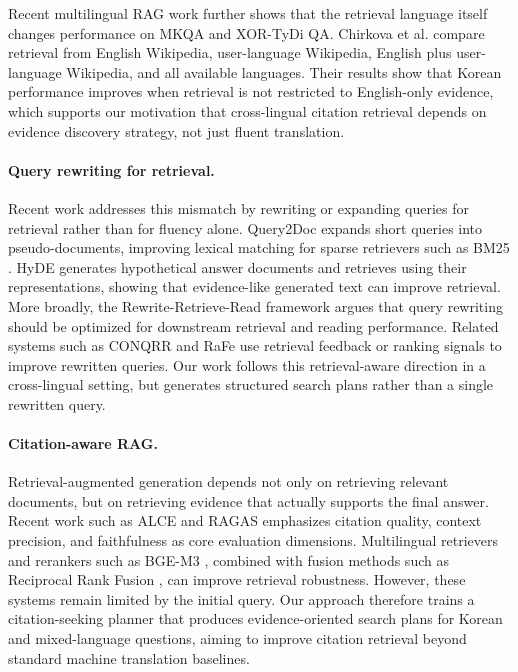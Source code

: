 \documentclass{article}
\begin{document}
Recent multilingual RAG work further shows that the retrieval language itself changes performance on MKQA and XOR-TyDi QA. Chirkova et al. \cite{chirkova2024mrag} compare retrieval from English Wikipedia, user-language Wikipedia, English plus user-language Wikipedia, and all available languages. Their results show that Korean performance improves when retrieval is not restricted to English-only evidence, which supports our motivation that cross-lingual citation retrieval depends on evidence discovery strategy, not just fluent translation.



\paragraph{Query rewriting for retrieval.}
Recent work addresses this mismatch by rewriting or expanding queries for retrieval rather than for fluency alone. Query2Doc \cite{wang2023query2doc} expands short queries into pseudo-documents, improving lexical matching for sparse retrievers such as BM25 \cite{robertson2009bm25}. HyDE \cite{gao2022precise} generates hypothetical answer documents and retrieves using their representations, showing that evidence-like generated text can improve retrieval. More broadly, the Rewrite-Retrieve-Read framework \cite{ma2023rewrite} argues that query rewriting should be optimized for downstream retrieval and reading performance. Related systems such as CONQRR \cite{anantha2021conqrr} and RaFe \cite{wang2024rafe} use retrieval feedback or ranking signals to improve rewritten queries. Our work follows this retrieval-aware direction in a cross-lingual setting, but generates structured search plans rather than a single rewritten query.

\paragraph{Citation-aware RAG.}
Retrieval-augmented generation depends not only on retrieving relevant documents, but on retrieving evidence that actually supports the final answer. Recent work such as ALCE \cite{gao2023enabling} and RAGAS \cite{es2023ragas} emphasizes citation quality, context precision, and faithfulness as core evaluation dimensions. Multilingual retrievers and rerankers such as BGE-M3 \cite{chen2024bgem3}, combined with fusion methods such as Reciprocal Rank Fusion \cite{cormack2009reciprocal}, can improve retrieval robustness. However, these systems remain limited by the initial query. Our approach therefore trains a citation-seeking planner that produces evidence-oriented search plans for Korean and mixed-language questions, aiming to improve citation retrieval beyond standard machine translation baselines.
\end{document}
